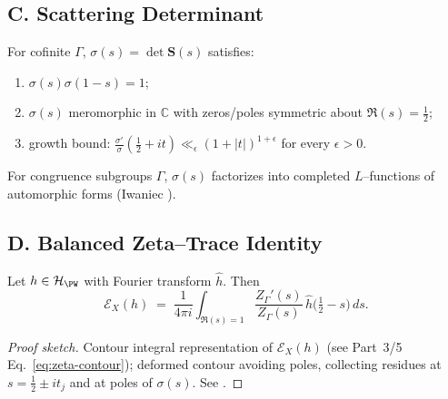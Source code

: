 
\subsection*{C. Scattering Determinant}
\label{subsec:scattering}

\begin{theorem}
\label{thm:sigma}
For cofinite $\Gamma$, $\sigma(s)=\det\mathbf S(s)$ satisfies:
\begin{enumerate}[label=(\roman*)]
  \item $\sigma(s)\sigma(1-s)=1$;
  \item $\sigma(s)$ meromorphic in $\mathbb C$ with zeros/poles symmetric about $\Re(s)=\tfrac12$;
  \item growth bound: $\frac{\sigma'}{\sigma}(\tfrac12+it)\ll_\epsilon (1+|t|)^{1+\epsilon}$ for every $\epsilon>0$.
\end{enumerate}
\end{theorem}

\begin{remark}
For congruence subgroups $\Gamma$, $\sigma(s)$ factorizes into completed $L$–functions of automorphic forms (Iwaniec \cite{Iwaniec2002}).
\end{remark}


\subsection*{D. Balanced Zeta–Trace Identity}
\label{subsec:zeta-trace}

\begin{theorem}
\label{thm:balanced-zeta}
Let $h\in\mathcal H_{\PW}$ with Fourier transform $\hat h$. Then
\[
  \mathcal E_X(h) \;=\; \frac{1}{4\pi i}\int_{\Re(s)=1}
     \frac{Z_\Gamma'(s)}{Z_\Gamma(s)}\,\hat h\!\Big(\tfrac12-s\Big)\,ds.
\]
\end{theorem}

\begin{proof}[Proof sketch]
Contour integral representation of $\mathcal E_X(h)$ (see Part~3/5 Eq.~\eqref{eq:zeta-contour}); deformed contour avoiding poles, collecting residues at $s=\tfrac12\pm it_j$ and at poles of $\sigma(s)$. See \cite{Hejhal1983II}.
\end{proof}

